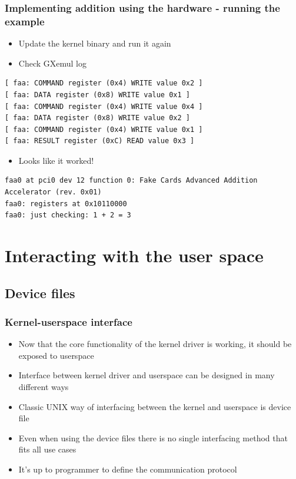 \documentclass[dvipsnames,table]{beamer}
\begin{document}
\begin{frame}[fragile]
\frametitle{Implementing addition using the hardware - running the example}
\begin{itemize}
	\item Update the kernel binary and run it again
	\item Check GXemul log
\end{itemize}
\begin{verbatim}
[ faa: COMMAND register (0x4) WRITE value 0x2 ]
[ faa: DATA register (0x8) WRITE value 0x1 ]
[ faa: COMMAND register (0x4) WRITE value 0x4 ]
[ faa: DATA register (0x8) WRITE value 0x2 ]
[ faa: COMMAND register (0x4) WRITE value 0x1 ]
[ faa: RESULT register (0xC) READ value 0x3 ]
\end{verbatim}
\begin{itemize}
	\item Looks like it worked!
\end{itemize}
\tiny
\begin{verbatim}
faa0 at pci0 dev 12 function 0: Fake Cards Advanced Addition Accelerator (rev. 0x01)
faa0: registers at 0x10110000
faa0: just checking: 1 + 2 = 3
\end{verbatim}
\end{frame}


\section{Interacting with the user space}

\subsection{Device files}

\begin{frame}
\frametitle{Kernel-userspace interface}
\begin{itemize}
	\item Now that the core functionality of the kernel driver is working, it should be exposed to userspace
	\item Interface between kernel driver and userspace can be designed in many different ways
	\item Classic UNIX way of interfacing between the kernel and userspace is device file
	\item Even when using the device files there is no single interfacing method that fits all use cases
	\item It's up to programmer to define the communication protocol
\end{itemize}
\end{frame}
\end{document}

